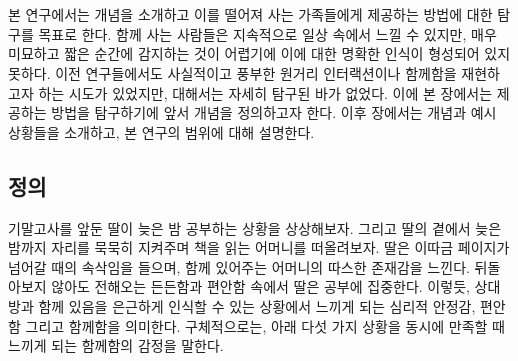 \chapter{\concept}
\label{sec:concept}



본 연구에서는 \concept{} 개념을 소개하고 이를 떨어져 사는 가족들에게 제공하는 방법에 대한 탐구를 목표로 한다. \concept\은 함께 사는 사람들은 지속적으로 일상 속에서 느낄 수 있지만, 매우 미묘하고 짧은 순간에 감지하는 것이 어렵기에 이에 대한 명확한 인식이 형성되어 있지 못하다. 이전 연구들에서도 사실적이고 풍부한 원거리 인터랙션이나 함께함을 재현하고자 하는 시도가 있었지만,  대해서는 자세히 탐구된 바가 없었다. 이에 본 장에서는 \concept\을 제공하는 방법을 탐구하기에 앞서 \concept{} 개념을 정의하고자 한다. 이후  장에서는  개념과 예시 상황들을 소개하고, 본 연구의 범위에 대해 설명한다. 

\section{ 정의}

기말고사를 앞둔 딸이 늦은 밤 공부하는 상황을 상상해보자. 그리고 딸의 곁에서 늦은 밤까지 자리를 묵묵히 지켜주며 책을 읽는 어머니를 떠올려보자. %
딸은 이따금 페이지가 넘어갈 때의 속삭임을 들으며, 함께 있어주는 어머니의 따스한 존재감을 느낀다. 뒤돌아보지 않아도 전해오는 든든함과 편안함 속에서 딸은 공부에 집중한다.
이렇듯, \concept\은 상대방과 함께 있음을 은근하게 인식할 수 있는 상황에서 느끼게 되는 심리적 안정감, 편안함 그리고 함께함을 의미한다.
구체적으로는, 아래 다섯 가지 상황을 동시에 만족할 때 느끼게 되는 함께함의 감정을 말한다. %



